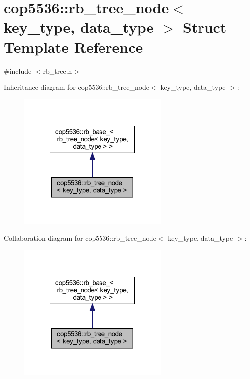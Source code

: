 \section{cop5536\+::rb\+\_\+tree\+\_\+node$<$ key\+\_\+type, data\+\_\+type $>$ Struct Template Reference}
\label{structcop5536_1_1rb__tree__node}


{\ttfamily \#include $<$rb\+\_\+tree.\+h$>$}



Inheritance diagram for cop5536\+::rb\+\_\+tree\+\_\+node$<$ key\+\_\+type, data\+\_\+type $>$\+:
\nopagebreak
\begin{figure}[H]
\begin{center}
\leavevmode
\includegraphics[width=208pt]{structcop5536_1_1rb__tree__node__inherit__graph}
\end{center}
\end{figure}


Collaboration diagram for cop5536\+::rb\+\_\+tree\+\_\+node$<$ key\+\_\+type, data\+\_\+type $>$\+:
\nopagebreak
\begin{figure}[H]
\begin{center}
\leavevmode
\includegraphics[width=208pt]{structcop5536_1_1rb__tree__node__coll__graph}
\end{center}
\end{figure}
